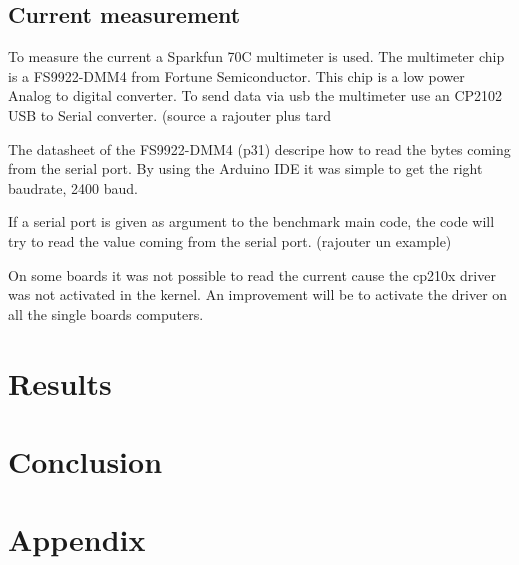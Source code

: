 \documentclass[english]{book_template} %
\begin{document}
\section{Current measurement}

To measure the current a Sparkfun 70C multimeter is used. The multimeter chip is a FS9922-DMM4 from Fortune Semiconductor. This chip is a low power Analog to digital converter.   To send data via usb the multimeter use an CP2102 USB to Serial converter. (source a rajouter plus tard %

The datasheet of the FS9922-DMM4 (p31) descripe how to read the bytes coming from the serial port. By using the Arduino IDE it was simple to get the right baudrate, 2400 baud. 

If a serial port is given as argument to the benchmark main code, the code will try to read the value coming from the serial port. (rajouter un example) 

On some boards it was not possible to read the current cause the cp210x driver was not activated in the kernel. An improvement will be to activate the driver on all the single boards computers.


\chapter{Results}   


\chapter{Conclusion}

 
\printbibliography
\thispagestyle{plain}
\newpage
{}
\chapter{Appendix}
\appendix



\end{document}
